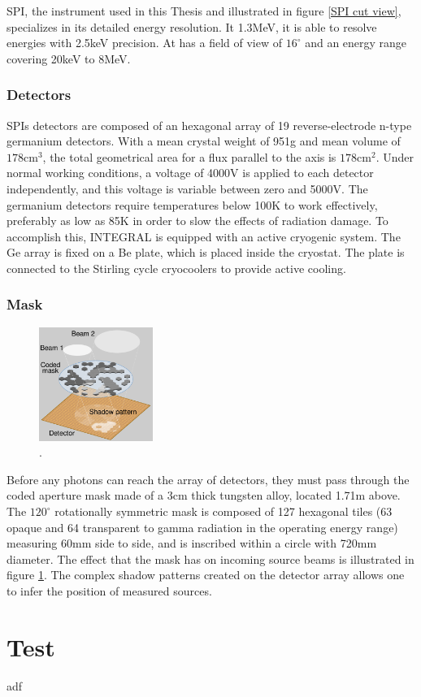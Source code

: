 \documentclass{article}
\begin{document}
SPI, the instrument used in this Thesis and illustrated in figure \ref{SPI cut view}, specializes in its detailed energy resolution. It 1.3MeV, it is able to resolve energies with 2.5keV precision. At has a field of view of $16^\circ$ and an energy range covering 20keV to 8MeV.

\subsubsection*{Detectors}
SPIs detectors are composed of an hexagonal array of 19 reverse-electrode n-type germanium detectors. With a mean crystal weight of 951g and mean volume of $178\text{cm}^3$, the total geometrical area for a flux parallel to the axis is $178\text{cm}^2$. Under normal working conditions, a voltage of 4000V is applied to each detector independently, and this voltage is variable between zero and 5000V. The germanium detectors require temperatures below 100K to work effectively, preferably as low as 85K in order to slow the effects of radiation damage. To accomplish this, INTEGRAL is equipped with an active cryogenic system. The Ge array is fixed on a Be plate, which is placed inside the cryostat. The plate is connected to the Stirling cycle cryocoolers to provide active cooling. 

\subsubsection*{Mask}
\begin{figure}
    \begin{center}
      \includegraphics[width=0.33\textwidth]{Images/General/HURA_hexagonal_coded_aperture_mask_principle.svg.png}
    \end{center}
    \caption{\cite{HURA}.}
    \label{HURA}
\end{figure}

Before any photons can reach the array of detectors, they must pass through the coded aperture mask made of a 3cm thick tungsten alloy, located 1.71m above. The $120^\circ$ rotationally symmetric mask is composed of 127 hexagonal tiles (63 opaque and 64 transparent to gamma radiation in the operating energy range) measuring 60mm side to side, and is inscribed within a circle with 720mm diameter. The effect that the mask has on incoming source beams is illustrated in figure \ref{HURA}. The complex shadow patterns created on the detector array allows one to infer the position of measured sources.







\section{Test}

\pagebreak

adf

\pagebreak

\nocite{*}
\printbibliography
\end{document}
